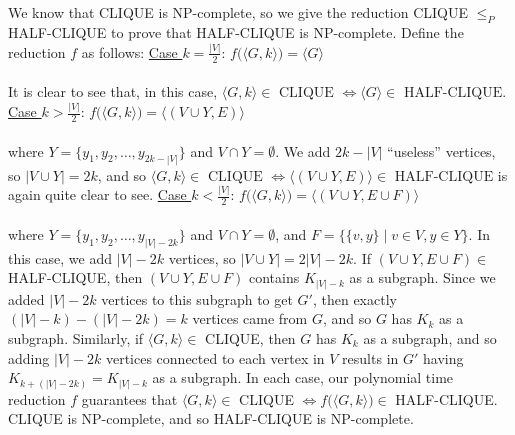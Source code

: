 \documentclass{article}
\begin{document}
\section{} %
We know that CLIQUE is NP-complete, so we give the reduction CLIQUE $\le_P$
HALF-CLIQUE to prove that HALF-CLIQUE is NP-complete. Define the reduction $f$
as follows:
\newline
\newline
\underline{Case $k=\frac{|V|}{2}$}:
$f\Big(\big\langle G,k\big\rangle\Big)=\big\langle G\big\rangle$\\\\
It is clear to see that, in this case,
$\big\langle G,k\big\rangle\in\text{ CLIQUE }\iff\big\langle G\big\rangle\in\text{ HALF-CLIQUE}$.
\newline
\newline
\underline{Case $k>\frac{|V|}{2}$}:
$f\Big(\big\langle G,k\big\rangle\Big)=\big\langle(V\cup Y,E)\big\rangle$\\\\
where $Y=\{y_1,y_2,\ldots,y_{2k-|V|}\}$ and $V\cap Y=\emptyset$. We add $2k-|V|$
``useless'' vertices, so $|V\cup Y|=2k$, and so
$\big\langle G,k\big\rangle\in\text{ CLIQUE }\iff\big\langle(V\cup Y,E)\big\rangle\in\text{ HALF-CLIQUE}$
is again quite clear to see.
\newline
\newline
\underline{Case $k<\frac{|V|}{2}$}:
$f\Big(\big\langle G,k\big\rangle\Big)=\big\langle(V\cup Y,E\cup F)\big\rangle$\\\\
where $Y=\{y_1,y_2,\ldots,y_{|V|-2k}\}$ and $V\cap Y=\emptyset$, and
$F=\{\{v,y\}\mid v\in V,y\in Y\}$.  In this case, we add $|V|-2k$ vertices, so
$|V\cup Y|=2|V|-2k$. If $(V\cup Y,E\cup F)\in$ HALF-CLIQUE, then
$(V\cup Y,E\cup F)$ contains $K_{|V|-k}$ as a subgraph. Since we added $|V|-2k$
vertices to this subgraph to get $G'$, then exactly $(|V|-k)-(|V|-2k)=k$ vertices
came from $G$, and so $G$ has $K_k$ as a subgraph. Similarly, if
$\big\langle G,k\big\rangle\in$ CLIQUE, then $G$ has $K_k$ as a subgraph, and so
adding $|V|-2k$ vertices connected to each vertex in $V$ results in $G'$ having
$K_{k+(|V|-2k)}=K_{|V|-k}$ as a subgraph. In each case, our polynomial time
reduction $f$ guarantees that $\big\langle G,k\big\rangle\in$ CLIQUE
$\iff f\Big(\big\langle G,k\big\rangle\Big)\in$ HALF-CLIQUE. CLIQUE is NP-complete,
and so HALF-CLIQUE is NP-complete.
\end{document}
